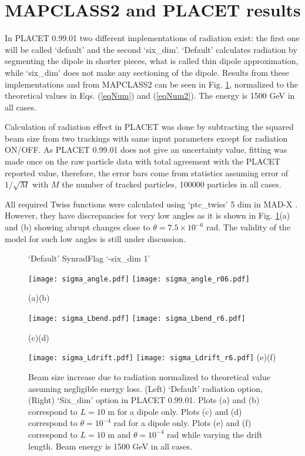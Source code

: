 \section{MAPCLASS2 and PLACET results}
In PLACET 0.99.01 two different implementations of radiation exist: the first one will be called `default' and the second `six\_dim'. `Default' calculates radiation by segmenting the dipole in shorter pieces, what is called thin dipole approximation, while `six\_dim' does not make any sectioning of the dipole. Results from these implementations and from MAPCLASS2 can be seen in Fig. \ref{figSR}, normalized to the theoretical values in Eqs. (\ref{eqNum}) and (\ref{eqNum2}). The energy is 1500 GeV in all cases.\par
Calculation of radiation effect in PLACET was done by subtracting the squared beam size from two trackings with same input parameters except for radiation ON/OFF. As PLACET 0.99.01 does not give an uncertainty value, fitting was made once on the raw particle data with total agreement with the PLACET reported value, therefore, the error bars come from statistics assuming error of $1/\sqrt{M}$ with $M$ the number of tracked particles, 100000 particles in all cases.\par
All required Twiss functions were calculated using `ptc\_twiss' 5 dim in MAD-X \cite{MADX}. However, they have discrepancies for very low angles as it is shown in Fig. \ref{figSR}(a) and (b) showing abrupt changes close to $\theta=7.5\times10^{-6}$ rad. The validity of the model for such low angles is still under discussion.
\begin{figure}[htb]
\centering
  \hspace*{1.2cm}`Default' Synrad\hspace*{5.0cm}Flag `-six\_dim 1'\par
 \texttt{[image: sigma\_angle.pdf]}
  \texttt{[image: sigma\_angle\_r06.pdf]}\par
  \hspace*{1.0cm}(a)\hspace*{7.6cm}(b)\par
   \texttt{[image: sigma\_Lbend.pdf]}
  \texttt{[image: sigma\_Lbend\_r6.pdf]}\par
  \hspace*{1.0cm}(c)\hspace*{7.6cm}(d)\par
  \texttt{[image: sigma\_Ldrift.pdf]}
  \texttt{[image: sigma\_Ldrift\_r6.pdf]}
  \hspace*{1.0cm}(e)\hspace*{7.6cm}(f)\par
\caption{Beam size increase due to radiation normalized to theoretical value assuming negligible energy loss. (Left) `Default' radiation option, (Right) `Six\_dim' option in PLACET 0.99.01. Plots (a) and (b) correspond to $L=10$ m for a dipole only. Plots (c) and (d) correspond to $\theta=10^{-4}$ rad for a dipole only. Plots (e) and (f) correspond to $L=10$ m and $\theta=10^{-4}$ rad while varying the drift length. Beam energy is 1500 GeV in all cases.}\label{figSR}
\end{figure}
\clearpage
